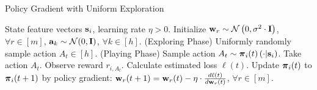 \begin{algorithm}[t]
   \caption{Policy Gradient with Uniform Exploration}
\label{alg:policy_gradient_uniform_exploration}
\begin{algorithmic}
    State feature vectors ${\mathbf{s}}_i$, learning rate $\eta > 0$.
   \STATE Initialize ${\mathbf{w}}_r \sim {\mathcal{N}}\left( 0, \sigma^2 \cdot {\mathbf{I}} \right)$, $\forall r \in [m]$, ${\mathbf{a}}_k \sim {\mathcal{N}}(0, {\mathbf{I}})$, $\forall k \in [h]$.
   \STATE (Exploring Phase)
   \STATE Uniformly randomly sample action $A_{t} \in [h]$. 
   \ELSE
   \STATE (Playing Phase)
   \STATE Sample action $A_{t} \sim {\boldsymbol{\pi}}_{i}(t)\left(\cdot \middle| {\mathbf{s}}_i \right)$.
   \ENDIF
   \STATE Take action $A_{t}$.
   \STATE Observe reward $r_{i, A_{t}}$.
   \STATE Calculate estimated loss $\ell(t)$.
   \STATE Update ${\boldsymbol{\pi}}_{i}(t)$ to ${\boldsymbol{\pi}}_{i}(t+1)$ by policy gradient: 
   \STATE ${\mathbf{w}}_r(t+1) = {\mathbf{w}}_r(t) - \eta \cdot \frac{d\ell(t)}{d {\mathbf{w}}_r(t)}$, $\forall r \in [m]$.
   \ENDFOR
\end{algorithmic}
\end{algorithm}

